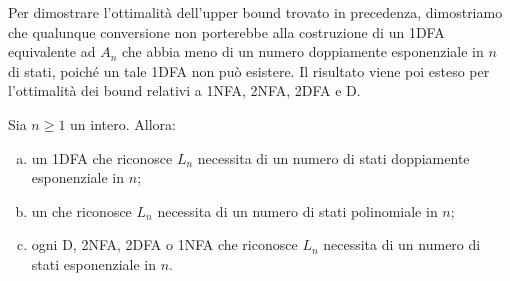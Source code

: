Per dimostrare l'ottimalità dell'upper bound trovato in precedenza, dimostriamo che qualunque conversione non porterebbe alla costruzione di un 1DFA equivalente ad $A_n$ che abbia meno di un numero doppiamente esponenziale in $n$ di stati, poiché un tale 1DFA non può esistere. Il risultato viene poi esteso per l'ottimalità dei bound relativi a 1NFA, 2NFA, 2DFA e D.
\begin{theor}\label{thm:a1l:lowLn}
	Sia $n\geq1$ un intero. Allora:
	\begin{enumerate}[(a)]
		\item \label{itm:a1l:lowLn:DFA} un 1DFA che riconosce $L_n$ necessita di un numero di stati doppiamente esponenziale in $n$;
		\item \label{itm:a1l:lowLn:1LA} un  che riconosce $L_n$ necessita di un numero di stati polinomiale in $n$;
		\item \label{itm:a1l:lowLn:NFA} ogni D, 2NFA, 2DFA o 1NFA che riconosce $L_n$ necessita di un numero di stati esponenziale in $n$.
	\end{enumerate}
\end{theor}
